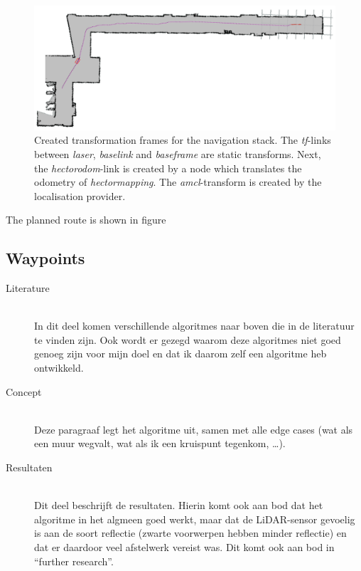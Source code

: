 \documentclass[conference,a4paper]{IEEEtran}
\begin{document}
\begin{figure}[!t]
	\includegraphics[width=\columnwidth]{navstack_result}
	\centering
	\caption{Created transformation frames for the navigation stack. The \emph{tf}-links between \emph{laser}, \emph{base\textunderscore link} and \emph{base\textunderscore frame} are static transforms. Next, the \emph{hector\textunderscore odom}-link is created by a node which translates the odometry of \emph{hector\textunderscore mapping}. The \emph{amcl}-transform is created by the localisation provider.}
	\label{fig:navstack_tf}
\end{figure}

The planned route is shown in figure

\subsection{Waypoints}
\begin{description}
\item[Literature] \hfill \\ In dit deel komen verschillende algoritmes naar boven die in de literatuur te vinden zijn. Ook wordt er gezegd waarom deze algoritmes niet goed genoeg zijn voor mijn doel en dat ik daarom zelf een algoritme heb ontwikkeld.

\item[Concept] \hfill \\ Deze paragraaf legt het algoritme uit, samen met alle edge cases (wat als een muur wegvalt, wat als ik een kruispunt tegenkom, \ldots).

\item[Resultaten] \hfill \\ Dit deel beschrijft de resultaten. Hierin komt ook aan bod dat het algoritme in het algmeen goed werkt, maar dat de LiDAR-sensor gevoelig is aan de soort reflectie (zwarte voorwerpen hebben minder reflectie) en dat er daardoor veel afstelwerk vereist was. Dit komt ook aan bod in “further research”.

\end{description}
\end{document}
